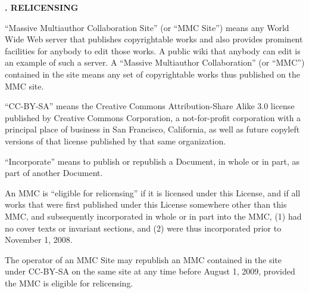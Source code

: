 \begin{flushleft}
    {\large\bfseries{}. RELICENSING\par}
\end{flushleft}


``Massive Multiauthor Collaboration Site'' (or ``MMC Site'') means any
World Wide Web server that publishes copyrightable works and also
provides prominent facilities for anybody to edit those works.  A
public wiki that anybody can edit is an example of such a server.  A
``Massive Multiauthor Collaboration'' (or ``MMC'') contained in the
site means any set of copyrightable works thus published on the MMC
site.

``CC-BY-SA'' means the Creative Commons Attribution-Share Alike 3.0
license published by Creative Commons Corporation, a not-for-profit
corporation with a principal place of business in San Francisco,
California, as well as future copyleft versions of that license
published by that same organization.

``Incorporate'' means to publish or republish a Document, in whole or
in part, as part of another Document.

An MMC is ``eligible for relicensing'' if it is licensed under this
License, and if all works that were first published under this License
somewhere other than this MMC, and subsequently incorporated in whole
or in part into the MMC, (1) had no cover texts or invariant sections,
and (2) were thus incorporated prior to November 1, 2008.

The operator of an MMC Site may republish an MMC contained in the site
under CC-BY-SA on the same site at any time before August 1, 2009,
provided the MMC is eligible for relicensing.

\endgroup

\endinput
